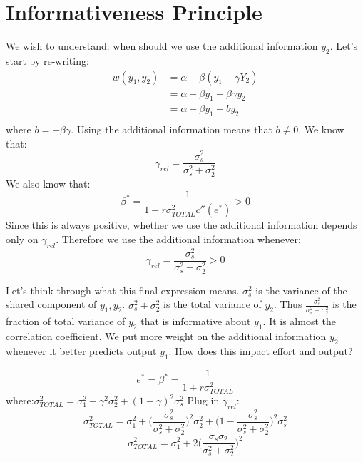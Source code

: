 \documentclass{article}
\begin{document}
\section{Informativeness Principle}
We wish to understand: when should we use the additional information $y_2$. Let's start by re-writing:
\begin{align*}
    w(y_1, y_{2}) &= \alpha + \beta (y_1 - \gamma Y_2)\\
    &= \alpha + \beta y_1 - \beta \gamma y_2 \\
    &= \alpha + \beta y_1 + b y_2 \\
\end{align*}
where $b = - \beta \gamma $. Using the additional information means that $b\neq 0$. We know that:
\[\gamma_{rel} = \frac{\sigma_s^2}{\sigma_s^2+\sigma_2^2} \]
We also know that:
\[\beta^* = \frac{1}{1+r \sigma^2_{TOTAL} c''(e^*)}>0 \]
Since this is always positive, whether we use the additional information depends only on $\gamma_{rel}$. Therefore we use the additional information whenever:
\[ \gamma_{rel} = \frac{\sigma_s^2}{\sigma_s^2+\sigma_2^2}>0 \]

Let's think through what this final expression means. $\sigma^2_s$ is the variance of the shared component of $y_1, y_2$. $\sigma_s^2+\sigma_2^2$ is the total variance of $y_2$. Thus $\frac{\sigma_s^2}{\sigma_s^2+\sigma_2^2}$ is the fraction of total variance of $y_2$ that is informative about $y_1$. It is almost the correlation coefficient. We put more weight on the additional information $y_2$ whenever it better predicts output $y_1$. How does this impact effort and output?

\[e^*=\beta^* = \frac{1}{1+r \sigma_{TOTAL}^2} \]
where:$\sigma_{TOTAL}^2=\sigma_1^2 + \gamma^2 \sigma^2_2 + (1-\gamma)^2\sigma_s^2 $
Plug in $\gamma_{rel}$:
\[\sigma_{TOTAL}^2=\sigma_1^2 + \bigg ( \frac{\sigma_s^2}{\sigma_s^2+\sigma_2^2} \bigg )^2 \sigma^2_2 + \bigg (1- \frac{\sigma_s^2}{\sigma_s^2+\sigma_2^2} \bigg )^2\sigma_s^2 \]
\[\sigma_{TOTAL}^2=\sigma_1^2 + 2\bigg ( \frac{\sigma_s \sigma_2}{\sigma_s^2+\sigma_2^2} \bigg )^2   \]
\end{document}
